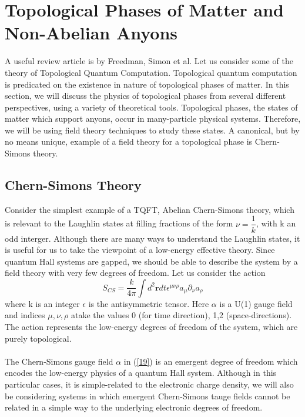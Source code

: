 \section{Topological Phases of Matter and Non-Abelian Anyons}
A useful review article is \cite{2008RvMP} by Freedman, Simon et al.
    Let us consider some of the theory of Topological Quantum Computation.
 Topological quantum computation is predicated on the existence in nature of topological phases of matter. In this section,
 we will discuss the physics of topological phases from several different perspectives, using a variety of theoretical tools.
 Topological phases, the states of matter which support anyons, occur in many-particle physical systems.
 Therefore, we will be using field theory techniques to study these states. A canonical, but by no means unique, example of a field
 theory for a topological phase is Chern-Simons theory. 
 \subsection{Chern-Simons Theory}
 Consider the simplest example of a TQFT, Abelian Chern-Simons theory, which is relevant to the Laughlin states at filling
 fractions of the form $\nu = \dfrac{1}{k}$, with k an odd interger. Although there are many ways to understand the Laughlin
 states, it is useful for us to take the viewpoint of a low-energy effective theory. Since quantum Hall systems are gapped, we
 should be able to describe the system by a field theory with very few degrees of freedom.
 Let us consider the action 
 \begin{equation}\label{19}
  S_{CS} = \dfrac{k}{4\pi} \int d^2 \mathbf{r} dt \epsilon^{\mu \nu \rho}a_{\mu}\partial_{\nu} a_{\rho}
 \end{equation}
where k is an integer $\epsilon$ is the antisymmetric tensor. Here $\alpha$ is a U(1) gauge field and indices $\mu, \nu, \rho$
atake the values 0 (for time direction), 1,2 (space-directions). The action represents the low-energy degrees of freedom of 
the system, which are purely topological.  \paragraph{}
   The Chern-Simons gauge field $\alpha$ in (\ref{19}) is an emergent degree of freedom which encodes the low-energy physics of a 
   quantum Hall system. Although in this particular cases, it is simple-related to the electronic charge density, we will also 
   be considering systems in which emergent Chern-Simons tauge fields cannot be related in a simple way to the underlying 
   electronic degrees of freedom. 
